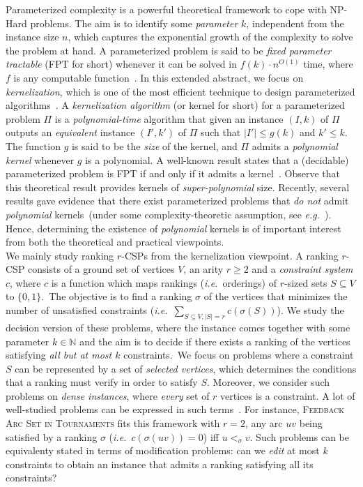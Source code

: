 \documentclass[11pt]{article}
\def\ie{{\em i.e.}~}
\newcommand{\FAST}{\textsc{Feedback Arc Set in Tournaments}}
\begin{document}
Parameterized complexity is a powerful theoretical framework to cope with NP-Hard problems. The aim is to identify some \emph{parameter} $k$, 
independent from the instance size $n$, which captures the exponential growth of the complexity to solve 
the problem at hand. A parameterized problem is said to be \emph{fixed parameter tractable} (FPT for short) whenever it can be solved in $f(k) \cdot n^{O(1)}$ time, 
where $f$ is any computable function~\cite{DF99,Nie06}. In this extended abstract, we focus on \emph{kernelization}, which is one of the most efficient technique to design parameterized algorithms~\cite{Bod09}. A \emph{kernelization algorithm} (or kernel for short) 
for a parameterized problem $\Pi$ is a \emph{polynomial-time} algorithm that given an 
instance $(I, k)$ of $\Pi$ outputs an \emph{equivalent} instance $(I',k')$ of $\Pi$ 
such that $|I'| \leqslant g(k)$ and $k' \leqslant k$. The function $g$ is said to be 
the \emph{size} of the kernel, and $\Pi$ admits a \emph{polynomial kernel} 
whenever $g$ is a polynomial. A well-known result states that a (decidable) parameterized problem 
is FPT if and only if it admits a kernel~\cite{Nie06}. Observe that this theoretical result provides kernels of \emph{super-polynomial} size. 
Recently, several results gave evidence that 
there exist parameterized problems that \emph{do not} admit \emph{polynomial} kernels~(under some complexity-theoretic assumption, see \emph{e.g.}~\cite{BDFH09,BJK11}). Hence, determining the existence of \emph{polynomial} kernels is of important interest from both 
the theoretical and practical viewpoints.  \\

We mainly study 
ranking $r$-CSPs from the kernelization viewpoint. 
A ranking $r$-CSP consists of a ground set of vertices $V$, an arity 
$r \geqslant 2$ and a \emph{constraint system} $c$, where $c$ is a function which maps rankings (\ie orderings) of $r$-sized sets $S \subseteq V$ to $\{0,1\}$.~The objective is to find a ranking  $\sigma$ of the vertices 
that minimizes the number of unsatisfied constraints (\ie $\sum_{S \subseteq V, |S| = r} c(\sigma(S))$). We study the decision version of these problems, where the instance comes together with some parameter $k \in \mathbb{N}$ and the aim is to decide if there exists a ranking of the vertices satisfying \emph{all 
but at most $k$} constraints.~We focus on problems where a constraint $S$ 
can be represented by a set of \emph{selected vertices}, which determines the conditions that 
a ranking must verify in order to satisfy $S$. Moreover, we consider such problems 
on \emph{dense instances}, where \emph{every} set of $r$ vertices is a constraint. 
A lot of well-studied problems can be expressed in such terms~\cite{ALS09, KS11}. 
For instance, \FAST{} fits this 
framework with $r = 2$, any arc $uv$ being satisfied by a ranking $\sigma$ (\ie $c(\sigma(uv)) = 0$) iff $u <_\sigma v$. 
Such problems can be equivalenty stated in terms of  
modification problems: can we \emph{edit} at most $k$ constraints to obtain an instance that admits a ranking satisfying all its constraints? \\
\end{document}
